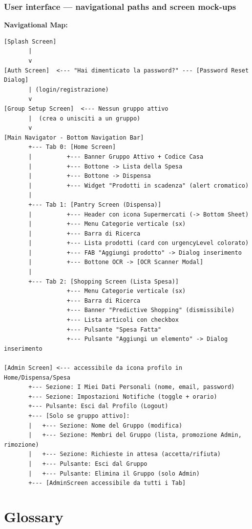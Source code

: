 \documentclass[12pt,a4paper]{article}
\begin{document}
\subsubsection{User interface — navigational paths and screen mock-ups}

\textbf{Navigational Map:}

\begin{verbatim}
[Splash Screen]
       |
       v
[Auth Screen]  <--- "Hai dimenticato la password?" --- [Password Reset Dialog]
       | (login/registrazione)
       v
[Group Setup Screen]  <--- Nessun gruppo attivo
       |  (crea o unisciti a un gruppo)
       v
[Main Navigator - Bottom Navigation Bar]
       +--- Tab 0: [Home Screen]
       |          +--- Banner Gruppo Attivo + Codice Casa
       |          +--- Bottone -> Lista della Spesa
       |          +--- Bottone -> Dispensa
       |          +--- Widget "Prodotti in scadenza" (alert cromatico)
       |
       +--- Tab 1: [Pantry Screen (Dispensa)]
       |          +--- Header con icona Supermercati (-> Bottom Sheet)
       |          +--- Menu Categorie verticale (sx)
       |          +--- Barra di Ricerca
       |          +--- Lista prodotti (card con urgencyLevel colorato)
       |          +--- FAB "Aggiungi prodotto" -> Dialog inserimento
       |          +--- Bottone OCR -> [OCR Scanner Modal]
       |
       +--- Tab 2: [Shopping Screen (Lista Spesa)]
                  +--- Menu Categorie verticale (sx)
                  +--- Barra di Ricerca
                  +--- Banner "Predictive Shopping" (dismissibile)
                  +--- Lista articoli con checkbox
                  +--- Pulsante "Spesa Fatta"
                  +--- Pulsante "Aggiungi un elemento" -> Dialog inserimento

[Admin Screen] <--- accessibile da icona profilo in Home/Dispensa/Spesa
       +--- Sezione: I Miei Dati Personali (nome, email, password)
       +--- Sezione: Impostazioni Notifiche (toggle + orario)
       +--- Pulsante: Esci dal Profilo (Logout)
       +--- [Solo se gruppo attivo]:
       |   +--- Sezione: Nome del Gruppo (modifica)
       |   +--- Sezione: Membri del Gruppo (lista, promozione Admin, rimozione)
       |   +--- Sezione: Richieste in attesa (accetta/rifiuta)
       |   +--- Pulsante: Esci dal Gruppo
       |   +--- Pulsante: Elimina il Gruppo (solo Admin)
       +--- [AdminScreen accessibile da tutti i Tab]
\end{verbatim}

\section{Glossary}
\end{document}
